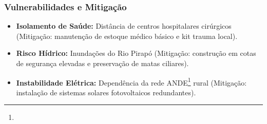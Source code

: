 \subsubsection{Vulnerabilidades e
Mitigação}

\begin{itemize}
\tightlist
\item
  \textbf{Isolamento de Saúde:} Distância de centros hospitalares
  cirúrgicos (Mitigação: manutenção de estoque médico básico e kit
  trauma local).
\item
  \textbf{Risco Hídrico:} Inundações do Rio Pirapó (Mitigação:
  construção em cotas de segurança elevadas e preservação de matas
  ciliares).
\item
  \textbf{Instabilidade Elétrica:} Dependência da rede ANDE\footnote{\fineANDE} rural
  (Mitigação: instalação de sistemas solares fotovoltaicos redundantes).
\end{itemize}


